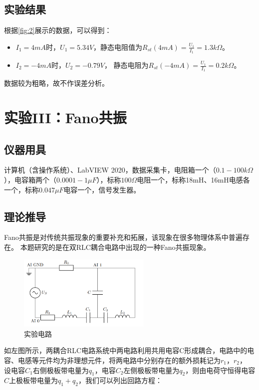 \documentclass[12pt, a4paper]{ctexart}
\begin{document}
\subsection{实验结果}

根据\ref{fig:2}展示的数据，可以得到：
\begin{itemize}
    \item $I_1 = 4mA$时，$U_1 = 5.34V$，静态电阻值为$R_{st}(4mA) = \frac{U_1}{I_1} = 1.3k\Omega$。
    \item $I_2 = -4mA$时，$U_2 = -0.79V$， 静态电阻为$R_{st}(-4mA) = \frac{U_1}{I_1} =0.2k\Omega$。
\end{itemize}

数据较为粗略，故不作误差分析。

\section{实验III：Fano共振}

\subsection{仪器用具}

计算机（含操作系统）、LabVIEW 2020，数据采集卡，电阻箱一个（$0.1-100k\Omega$），电容箱两个（$0.0001-1\mu F$），标称$100\Omega$电阻一个，标称18mH、16mH电感各一个，标称$0.047\mu F$电容一个，信号发生器。

\subsection{理论推导}

Fano共振是对传统共振现象的重要补充和拓展，该现象在很多物理体系中普遍存在。
本题研究的是在双RLC耦合电路中出现的一种Fano共振现象。

\begin{figure}
    \includegraphics[width=2.5in]{figure/Fano_circuiTikz.png}
    \caption{实验电路}
    \label{fig:3}
\end{figure}

如左图所示，两耦合RLC电路系统中两电路利用共用电容C形成耦合，电路中的电容、电感等元件均为非理想元件，将两电路中分别存在的额外损耗记为$r_1$，$r_2$，
设电容$C_1$右侧极板带电量为$q_1$，电容$C_2$左侧极板带电量为$q_2$，则由电荷守恒得电容$C$上极板带电量为$q_1 + q_2$，我们可以列出回路方程：
\end{document}
